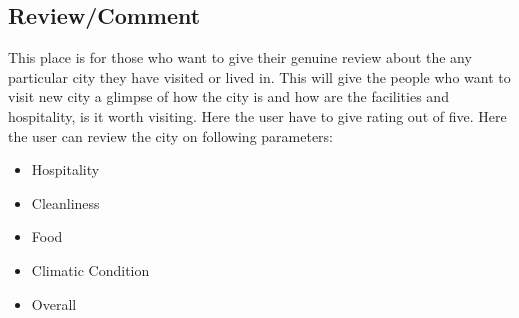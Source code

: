 \documentclass{article}
\begin{document}
\subsection{Review/Comment}
This place is for those who want to give their genuine review about the any particular city they have visited or lived in. This will give the people who want to visit new city a glimpse of how the city is and how are the facilities and hospitality, is it worth visiting. Here the user have to give rating out of five. 
Here the user can review the city on following parameters:
\begin{itemize}
    \item Hospitality
    \item Cleanliness
    \item Food
    \item Climatic Condition
    \item Overall
\end{itemize}
\end{document}
